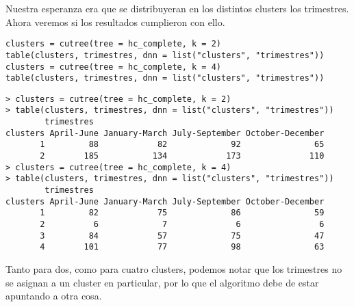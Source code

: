 \documentclass[b4paper]{article}
\begin{document}
    Nuestra esperanza era que se distribuyeran en los distintos clusters los trimestres.
    Ahora veremos si los resultados cumplieron con ello.
    \begin{tcolorbox}[title = input]
        \begin{verbatim}
clusters = cutree(tree = hc_complete, k = 2)
table(clusters, trimestres, dnn = list("clusters", "trimestres"))
clusters = cutree(tree = hc_complete, k = 4)
table(clusters, trimestres, dnn = list("clusters", "trimestres"))\end{verbatim}
    \end{tcolorbox}
    \begin{tcolorbox}[title = output]
        \begin{verbatim}
> clusters = cutree(tree = hc_complete, k = 2)
> table(clusters, trimestres, dnn = list("clusters", "trimestres"))
        trimestres
clusters April-June January-March July-September October-December
       1         88            82             92               65
       2        185           134            173              110
> clusters = cutree(tree = hc_complete, k = 4)
> table(clusters, trimestres, dnn = list("clusters", "trimestres"))
        trimestres
clusters April-June January-March July-September October-December
       1         82            75             86               59
       2          6             7              6                6
       3         84            57             75               47
       4        101            77             98               63\end{verbatim}
    \end{tcolorbox}
    Tanto para dos, como para cuatro clusters, podemos notar que los trimestres no
    se asignan a un cluster en particular, por lo que el algoritmo debe de estar 
    apuntando a otra cosa.
\end{document}
